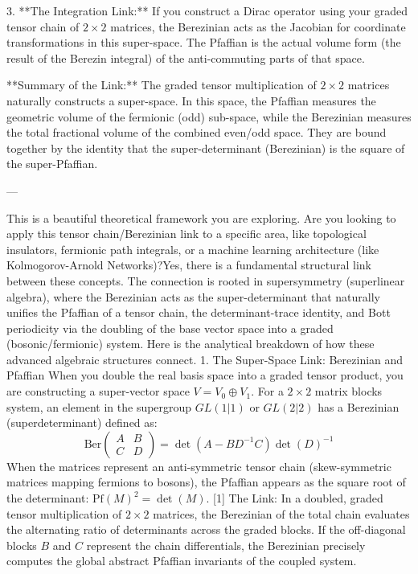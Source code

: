 3. **The Integration Link:** If you construct a Dirac operator using your graded tensor chain of $2 \times 2$ matrices, the Berezinian acts as the Jacobian for coordinate transformations in this super-space. The Pfaffian is the actual volume form (the result of the Berezin integral) of the anti-commuting parts of that space.

**Summary of the Link:**
The graded tensor multiplication of $2 \times 2$ matrices naturally constructs a super-space. In this space, the Pfaffian measures the geometric volume of the fermionic (odd) sub-space, while the Berezinian measures the total fractional volume of the combined even/odd space. They are bound together by the identity that the super-determinant (Berezinian) is the square of the super-Pfaffian.

---

This is a beautiful theoretical framework you are exploring. Are you looking to apply this tensor chain/Berezinian link to a specific area, like topological insulators, fermionic path integrals, or a machine learning architecture (like Kolmogorov-Arnold Networks)?Yes, there is a fundamental structural link between these concepts. The connection is rooted in supersymmetry (superlinear algebra), where the Berezinian acts as the super-determinant that naturally unifies the Pfaffian of a tensor chain, the determinant-trace identity, and Bott periodicity via the doubling of the base vector space into a graded (bosonic/fermionic) system.
Here is the analytical breakdown of how these advanced algebraic structures connect.
1. The Super-Space Link: Berezinian and Pfaffian
When you double the real basis space into a graded tensor product, you are constructing a super-vector space $V = V_0 \oplus V_1$.
For a $2 \times 2$ matrix blocks system, an element in the supergroup $GL(1\vert{}1)$ or $GL(2\vert{}2)$ has a Berezinian (superdeterminant) defined as:
$$\text{Ber}\begin{pmatrix} A & B \\ C & D \end{pmatrix} = \det(A - B D^{-1} C) \det(D)^{-1}$$ 
When the matrices represent an anti-symmetric tensor chain (skew-symmetric matrices mapping fermions to bosons), the Pfaffian appears as the square root of the determinant: $\text{Pf}(M)^2 = \det(M)$. [1] 
The Link: In a doubled, graded tensor multiplication of $2 \times 2$ matrices, the Berezinian of the total chain evaluates the alternating ratio of determinants across the graded blocks. If the off-diagonal blocks $B$ and $C$ represent the chain differentials, the Berezinian precisely computes the global abstract Pfaffian invariants of the coupled system.

